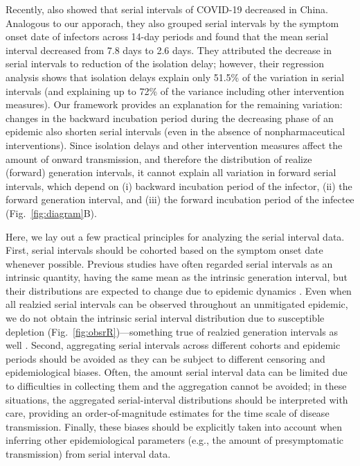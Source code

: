 \documentclass[12pt]{article}
\newcommand{\fref}[1]{Fig.~\ref{fig:#1}}
\begin{document}
Recently, \cite{ali2020serial} also showed that serial intervals of COVID-19 decreased in China. Analogous to our apporach, they also grouped serial intervals by the symptom onset date of infectors across 14-day periods and found that the mean serial interval decreased from 7.8 days to 2.6 days.
They attributed the decrease in serial intervals to reduction of the isolation delay; however, their regression analysis shows that isolation delays explain only 51.5\% of the variation in serial intervals (and explaining up to 72\% of the variance including other intervention measures).
Our framework provides an explanation for the remaining variation: changes in the backward incubation period during the decreasing phase of an epidemic also shorten serial intervals (even in the absence of nonpharmaceutical interventions). 
Since isolation delays and other intervention measures affect the amount of onward transmission, and therefore the distribution of realize (forward) generation intervals, it cannot explain all variation in forward serial intervals, which depend on (i) backward incubation period of the infector, (ii) the forward generation interval, and (iii) the forward incubation period of the infectee (\fref{diagram}B).

Here, we lay out a few practical principles for analyzing the serial interval data.
First, serial intervals should be cohorted based on the symptom onset date whenever possible.
Previous studies have often regarded serial intervals as an intrinsic quantity, having the same mean as the intrinsic generation interval, but their distributions are expected to change due to epidemic dynamics \citep{svensson2007note,klinkenberg2011correlation,champredon2018equivalence, britton2019estimation}.
Even when all realzied serial intervals can be observed throughout an unmitigated epidemic, we do not obtain the intrinsic serial interval distribution due to susceptible depletion (\fref{obsrR})---something true of realzied generation intervals as well \citep{park2020inferring}.
Second, aggregating serial intervals across different cohorts and epidemic periods should be avoided as they can be subject to different censoring and epidemiological biases.
Often, the amount serial interval data can be limited due to difficulties in collecting them and the aggregation cannot be avoided; in these situations, the aggregated serial-interval distributions should be interpreted with care, providing an order-of-magnitude estimates for the time scale of disease transmission.
Finally, these biases should be explicitly taken into account when inferring other epidemiological parameters (e.g., the amount of presymptomatic transmission) from serial interval data.
\end{document}
